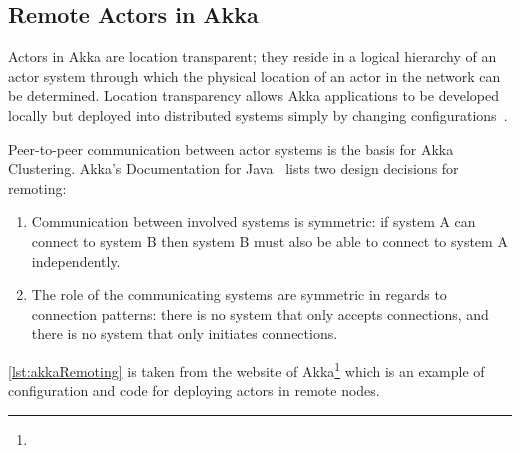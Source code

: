   \subsection{Remote Actors in Akka}
  Actors in Akka are location transparent; they reside in a logical hierarchy of an actor system through which the physical location of an actor in the network can be determined. Location transparency allows Akka applications to be developed locally but deployed into distributed systems simply by changing configurations~\cite{akkaJavaDoc}.

  Peer-to-peer communication between actor systems is the basis for Akka Clustering. Akka's Documentation for Java~\cite{akkaJavaDoc} lists two design decisions for remoting:
\begin{enumerate}

  \item Communication between involved systems is symmetric: if system A can connect to system B then system B must also be able to connect to system A independently.

  \item The role of the communicating systems are symmetric in regards to connection patterns: there is no system that only accepts connections, and there is no system that only initiates connections.
\end{enumerate}

\autoref{lst:akkaRemoting} is taken from the website of Akka\footnote{} which is an example of configuration and code for deploying actors in remote nodes.

